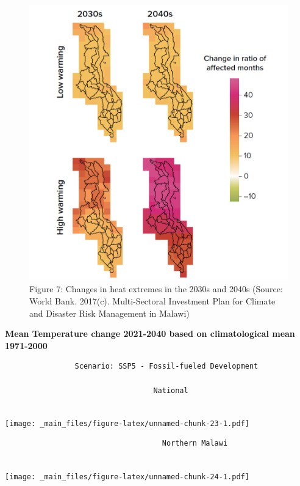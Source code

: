 \documentclass[
]{book}
\begin{document}
\begin{figure}
\centering
\includegraphics{images/heat_extremes.png}
\caption{Figure 7: Changes in heat extremes in the 2030s and 2040s (Source: World Bank. 2017(c). Multi-Sectoral Investment Plan for Climate and Disaster Risk Management in Malawi)}
\end{figure}

\textbf{Mean Temperature change 2021-2040 based on climatological mean 1971-2000}

\begin{verbatim}
                Scenario: SSP5 - Fossil-fueled Development
                                  
                                  National
                               
\end{verbatim}

\texttt{[image: \_main\_files/figure-latex/unnamed-chunk-23-1.pdf]}

\begin{verbatim}
                                    Northern Malawi
                      
\end{verbatim}

\texttt{[image: \_main\_files/figure-latex/unnamed-chunk-24-1.pdf]}
\end{document}
